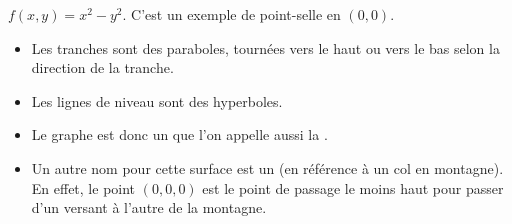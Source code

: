 \documentclass[11pt, class=report,crop=false]{standalone}
\begin{document}
\begin{exemple}
$f(x,y) = x^2 - y^2$. C'est un exemple de point-selle en $(0,0)$.

\begin{itemize}
  \item Les tranches sont des paraboles, tournées vers le haut ou vers le bas selon la direction de la tranche.
  \item Les lignes de niveau sont des hyperboles.
  \item Le graphe est donc un  que l'on appelle aussi la .
  \item Un autre nom pour cette surface est un  (en référence à un col en montagne). 
  En effet, le point $(0,0,0)$ est le point de passage le moins haut pour passer d'un versant à l'autre de la montagne. 
\end{itemize}


\end{exemple}
\end{document}
